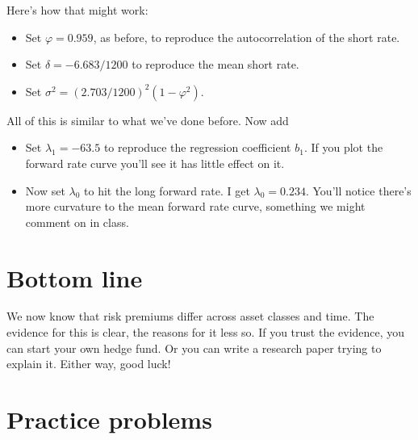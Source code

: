 \documentclass[11pt]{article}
\begin{document}
Here's how that might work:
%
\begin{itemize}
\item Set $\varphi = 0.959$, as before, to reproduce the
autocorrelation of the short rate.
\item Set $\delta = - 6.683/1200$ to reproduce the mean short rate.
\item Set $ \sigma^2 = (2.703/1200)^2 (1-\varphi^2)$.
\end{itemize}
All of this is similar to what we've done before.
Now add
\begin{itemize}
\item Set $\lambda_1=-63.5$ to reproduce the regression coefficient $b_1$.
If you plot the forward rate curve you'll see it has little effect on it.
\item Now set $\lambda_0$ to hit the long forward rate.  I get
$\lambda_0 = 0.234$.
You'll notice there's more curvature to the mean forward rate curve,
something we might comment on in class.
\end{itemize}


\section*{Bottom line}

We now know that risk premiums differ across asset classes
and time.
The evidence for this is clear, the reasons for it less so.
If you trust the evidence, you can start your own hedge fund.
Or you can write a research paper trying to explain it.
Either way, good luck!


\section*{Practice problems}
\end{document}
